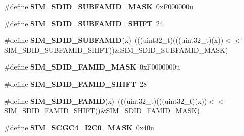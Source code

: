 \begin{DoxyCompactItemize}
\item 
\mbox{\label{group___s_i_m___register___masks_ga530d8fe59d2589cf56c00456e89487aa}} 
\#define {\bfseries S\+I\+M\+\_\+\+S\+D\+I\+D\+\_\+\+S\+U\+B\+F\+A\+M\+I\+D\+\_\+\+M\+A\+SK}~0x\+F000000u
\item 
\mbox{\label{group___s_i_m___register___masks_ga5e40d63bf136287a591bb4fa0b019aba}} 
\#define {\bfseries S\+I\+M\+\_\+\+S\+D\+I\+D\+\_\+\+S\+U\+B\+F\+A\+M\+I\+D\+\_\+\+S\+H\+I\+FT}~24
\item 
\mbox{\label{group___s_i_m___register___masks_gaba1b690ef87b8401c561fdb1ac2248f0}} 
\#define {\bfseries S\+I\+M\+\_\+\+S\+D\+I\+D\+\_\+\+S\+U\+B\+F\+A\+M\+ID}(x)~(((uint32\+\_\+t)(((uint32\+\_\+t)(x))$<$$<$S\+I\+M\+\_\+\+S\+D\+I\+D\+\_\+\+S\+U\+B\+F\+A\+M\+I\+D\+\_\+\+S\+H\+I\+FT))\&S\+I\+M\+\_\+\+S\+D\+I\+D\+\_\+\+S\+U\+B\+F\+A\+M\+I\+D\+\_\+\+M\+A\+SK)
\item 
\mbox{\label{group___s_i_m___register___masks_ga5344e7283b2aead14d9d3bded0114f3b}} 
\#define {\bfseries S\+I\+M\+\_\+\+S\+D\+I\+D\+\_\+\+F\+A\+M\+I\+D\+\_\+\+M\+A\+SK}~0x\+F0000000u
\item 
\mbox{\label{group___s_i_m___register___masks_ga377bc761e6ee1caab79baad3e2d0d331}} 
\#define {\bfseries S\+I\+M\+\_\+\+S\+D\+I\+D\+\_\+\+F\+A\+M\+I\+D\+\_\+\+S\+H\+I\+FT}~28
\item 
\mbox{\label{group___s_i_m___register___masks_gad745ac0cdf951b6e7a8fd2f3e133d961}} 
\#define {\bfseries S\+I\+M\+\_\+\+S\+D\+I\+D\+\_\+\+F\+A\+M\+ID}(x)~(((uint32\+\_\+t)(((uint32\+\_\+t)(x))$<$$<$S\+I\+M\+\_\+\+S\+D\+I\+D\+\_\+\+F\+A\+M\+I\+D\+\_\+\+S\+H\+I\+FT))\&S\+I\+M\+\_\+\+S\+D\+I\+D\+\_\+\+F\+A\+M\+I\+D\+\_\+\+M\+A\+SK)
\item 
\mbox{\label{group___s_i_m___register___masks_ga55fc2bdfb36e61b4771015749307c480}} 
\#define {\bfseries S\+I\+M\+\_\+\+S\+C\+G\+C4\+\_\+\+I2\+C0\+\_\+\+M\+A\+SK}~0x40u
\item 
\mbox{\label{group___s_i_m___register___masks_ga50185bca8ae97e6b0b0a70541757680b}} 

\end{DoxyCompactItemize}
